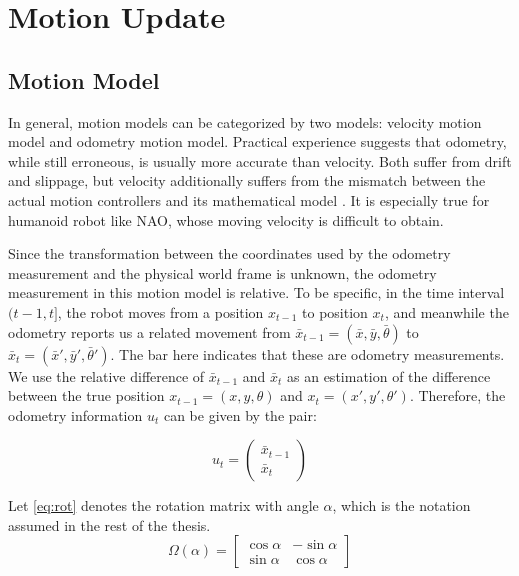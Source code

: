 \section{Motion Update}\label{sec:Motion Update}
\subsection{Motion Model}\label{sub:Motion Model}
In general, motion models can be categorized by two models: velocity motion model and odometry motion model. Practical experience suggests that odometry, while still erroneous, is usually more accurate than velocity. Both suffer from drift and slippage, but velocity additionally suffers from the mismatch between the actual motion controllers and its mathematical model \cite{thrun2005probabilistic}. It is especially true for humanoid robot like NAO, whose moving velocity is difficult to obtain. 

Since the transformation between the coordinates used by the odometry measurement and the physical world frame is unknown, the odometry measurement in this motion model is relative. 
To be specific, in the time interval $(t-1, t]$, the robot moves from a position $x_{t-1}$ to position $x_t$, and meanwhile the odometry reports us a related movement from $\bar{x}_{t-1} = (\bar{x}, \bar{y}, \bar{\theta})$ to $\bar{x}_{t} = (\bar{x}', \bar{y}', \bar{\theta}')$. The bar here indicates that these are odometry measurements. We use the relative difference of $\bar{x}_{t-1}$ and $\bar{x}_{t}$ as an estimation of the difference between the true position $x_{t-1} = (x, y, \theta)$ and $x_t = (x', y', \theta')$. Therefore, the odometry information $u_t$ can be given by the pair:

\begin{equation}\label{eq:ut}
u_t = \begin{pmatrix}
\bar{x}_{t-1}\\ 
\bar{x}_{t}
\end{pmatrix}
\end{equation}

Let \autoref{eq:rot} denotes the rotation matrix with angle $\alpha$, which is the notation assumed in the rest of the thesis. 
\begin{equation}\label{eq:rot}
\Omega(\alpha) = \begin{bmatrix}
\cos{\alpha} &  -\sin{\alpha} \\
\sin{\alpha} &  \cos{\alpha}
\end{bmatrix}
\end{equation}

